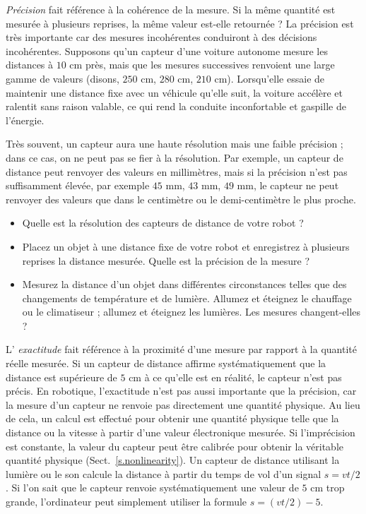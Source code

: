 \emph{Précision} fait référence à la cohérence de la mesure. Si la même quantité est mesurée à plusieurs reprises, la même valeur est-elle retournée ? La précision est très importante car des mesures incohérentes conduiront à des décisions incohérentes. Supposons qu'un capteur d'une voiture autonome mesure les distances à $10$ cm près, mais que les mesures successives renvoient une large gamme de valeurs (disons, $250$ cm, $280$ cm, $210$ cm). Lorsqu'elle essaie de maintenir une distance fixe avec un véhicule qu'elle suit, la voiture accélère et ralentit sans raison valable, ce qui rend la conduite inconfortable et gaspille de l'énergie.

Très souvent, un capteur aura une haute résolution mais une faible précision ; dans ce cas, on ne peut pas se fier à la résolution. Par exemple, un capteur de distance peut renvoyer des valeurs en millimètres, mais si la précision n'est pas suffisamment élevée, par exemple $45$ mm, $43$ mm, $49$ mm, le capteur ne peut renvoyer des valeurs que dans le centimètre ou le demi-centimètre le plus proche.

\begin{framed}
\begin{itemize}
\item Quelle est la résolution des capteurs de distance de votre robot ?
\item Placez un objet à une distance fixe de votre robot et enregistrez à plusieurs reprises la distance mesurée. Quelle est la précision de la mesure ?
\item Mesurez la distance d'un objet dans différentes circonstances telles que des changements de température et de lumière. Allumez et éteignez le chauffage ou le climatiseur ; allumez et éteignez les lumières. Les mesures changent-elles ?
\end{itemize}
\end{framed}

L' \emph{exactitude} fait référence à la proximité d'une mesure par rapport à la quantité réelle mesurée. Si un capteur de distance affirme systématiquement que la distance est supérieure de $5$ cm à ce qu'elle est en réalité, le capteur n'est pas précis. En robotique, l'exactitude n'est pas aussi importante que la précision, car la mesure d'un capteur ne renvoie pas directement une quantité physique. Au lieu de cela, un calcul est effectué pour obtenir une quantité physique telle que la distance ou la vitesse à partir d'une valeur électronique mesurée. Si l'imprécision est constante, la valeur du capteur peut être calibrée pour obtenir la véritable quantité physique (Sect.~\ref{s.nonlinearity}). Un capteur de distance utilisant la lumière ou le son calcule la distance à partir du temps de vol d'un signal $s=vt/2$. Si l'on sait que le capteur renvoie systématiquement une valeur de $5$ cm trop grande, l'ordinateur peut simplement utiliser la formule $s=(vt/2) - 5$.

